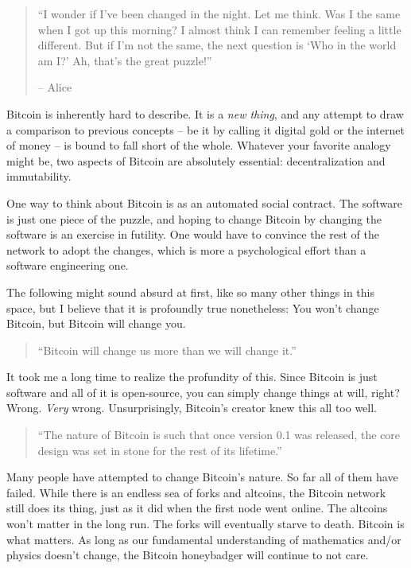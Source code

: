 \label{les:1}

\blockquote{
``I wonder if I've been changed in the night. Let me think. Was I the same when I
got up this morning? I almost think I can remember feeling a little different.
But if I'm not the same, the next question is `Who in the world am I?' Ah,
that's the great puzzle!''

-- Alice
}

Bitcoin is inherently hard to describe. It is a \textit{new thing}, and any
attempt to draw a comparison to previous concepts -- be it by calling
it digital gold or the internet of money -- is bound to fall short of
the whole. Whatever your favorite analogy might be, two aspects of
Bitcoin are absolutely essential: decentralization and immutability.

One way to think about Bitcoin is as an automated social
contract.\cite{social-contract} The software is just one piece of the puzzle,
and hoping to change Bitcoin by changing the software is an exercise in
futility. One would have to convince the rest of the network to adopt the
changes, which is more a psychological effort than a software engineering one.

The following might sound absurd at first, like so many other things in
this space, but I believe that it is profoundly true nonetheless: You
won't change Bitcoin, but Bitcoin will change you.

\blockquote{
``Bitcoin will change us more than we will change it.''\cite{tftc21}
}

It took me a long time to realize the profundity of this. Since Bitcoin
is just software and all of it is open-source, you can simply change
things at will, right? Wrong. \textit{Very} wrong. Unsurprisingly, Bitcoin's
creator knew this all too well.

\blockquote{
``The nature of Bitcoin is such that once version 0.1 was released, the core
design was set in stone for the rest of its
lifetime.''\cite{satoshi-set-in-stone}
}

Many people have attempted to change Bitcoin's nature. So far all of
them have failed. While there is an endless sea of forks and altcoins,
the Bitcoin network still does its thing, just as it did when the first
node went online. The altcoins won't matter in the long run. The forks
will eventually starve to death. Bitcoin is what matters. As long as our
fundamental understanding of mathematics and/or physics doesn't change,
the Bitcoin honeybadger will continue to not care.

